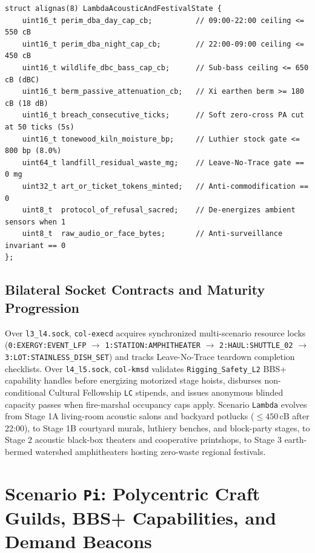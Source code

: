 \begin{lstlisting}[caption={Scenario \texttt{Lambda} Time-of-Day Perimeter Decibel Envelope and Leave-No-Trace Saga State},label={lst:lambda-structs}]
struct alignas(8) LambdaAcousticAndFestivalState {
    uint16_t perim_dba_day_cap_cb;          // 09:00-22:00 ceiling <= 550 cB
    uint16_t perim_dba_night_cap_cb;        // 22:00-09:00 ceiling <= 450 cB
    uint16_t wildlife_dbc_bass_cap_cb;      // Sub-bass ceiling <= 650 cB (dBC)
    uint16_t berm_passive_attenuation_cb;   // Xi earthen berm >= 180 cB (18 dB)
    uint16_t breach_consecutive_ticks;      // Soft zero-cross PA cut at 50 ticks (5s)
    uint16_t tonewood_kiln_moisture_bp;     // Luthier stock gate <= 800 bp (8.0%)
    uint64_t landfill_residual_waste_mg;    // Leave-No-Trace gate == 0 mg
    uint32_t art_or_ticket_tokens_minted;   // Anti-commodification == 0
    uint8_t  protocol_of_refusal_sacred;    // De-energizes ambient sensors when 1
    uint8_t  raw_audio_or_face_bytes;       // Anti-surveillance invariant == 0
};
\end{lstlisting}

\subsection{Bilateral Socket Contracts and Maturity Progression}

Over \texttt{l3\_l4.sock}, \texttt{col-execd} acquires synchronized multi-scenario resource locks
(\texttt{0:EXERGY:EVENT\_LFP} $\to$ \texttt{1:STATION:AMPHITHEATER} $\to$ \texttt{2:HAUL:SHUTTLE\_02} $\to$
\texttt{3:LOT:STAINLESS\_DISH\_SET}) and tracks Leave-No-Trace teardown completion checklists. Over
\texttt{l4\_l5.sock}, \texttt{col-kmsd} validates \texttt{Rigging\_Safety\_L2} BBS+ capability handles
before energizing motorized stage hoists, disburses non-conditional Cultural Fellowship \texttt{LC}
stipends, and issues anonymous blinded capacity passes when fire-marshal occupancy caps apply. Scenario
\texttt{Lambda} evolves from Stage 1A living-room acoustic salons and backyard potlucks ($\le 450\,\mathrm{cB}$
after 22:00), to Stage 1B courtyard murals, luthiery benches, and block-party stages, to Stage 2 acoustic
black-box theaters and cooperative printshops, to Stage 3 earth-bermed watershed amphitheaters hosting
zero-waste regional festivals.

\section{Scenario \texttt{Pi}: Polycentric Craft Guilds, BBS+ Capabilities, and Demand Beacons}
\label{sec:scn-pi}

